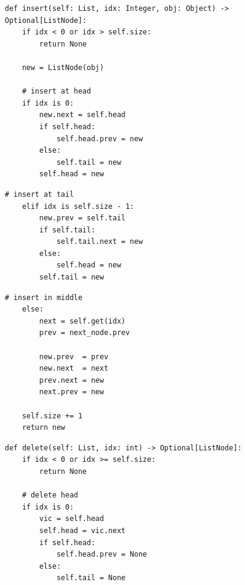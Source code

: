 \documentclass[mathserif, handout]{beamer}
\begin{document}
\begin{frame}[fragile]
	\begin{thmboxtop}
		\begin{lstlisting}[style=mypython]
def insert(self: List, idx: Integer, obj: Object) -> Optional[ListNode]:
    if idx < 0 or idx > self.size:
        return None
        
    new = ListNode(obj)
    
    # insert at head
    if idx is 0:
        new.next = self.head
        if self.head:
            self.head.prev = new
        else:
            self.tail = new 
        self.head = new
\end{lstlisting}
	\end{thmboxtop}
\end{frame}

\begin{frame}[fragile]
	\begin{thmboxside}
		\begin{lstlisting}[style=mypython, firstnumber=last]
    # insert at tail
    elif idx is self.size - 1:
        new.prev = self.tail
        if self.tail:
            self.tail.next = new
        else:
            self.head = new
        self.tail = new
\end{lstlisting}
	\end{thmboxside}
\end{frame}

\begin{frame}[fragile]
	\begin{thmboxbot}
		\begin{lstlisting}[style=mypython, firstnumber=last]        
    # insert in middle
    else:
        next = self.get(idx)
        prev = next_node.prev

        new.prev  = prev
        new.next  = next
        prev.next = new
        next.prev = new

    self.size += 1
    return new
\end{lstlisting}
	\end{thmboxbot}
\end{frame}

\begin{frame}[fragile]
	\begin{thmboxtop}
		\begin{lstlisting}[style=mypython]
def delete(self: List, idx: int) -> Optional[ListNode]:
    if idx < 0 or idx >= self.size:
        return None
        
    # delete head
    if idx is 0:
        vic = self.head
        self.head = vic.next
        if self.head:
            self.head.prev = None
        else:
            self.tail = None
\end{lstlisting}
	\end{thmboxtop}
\end{frame}
\end{document}
